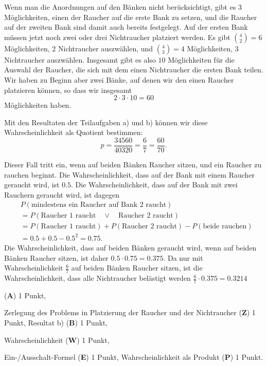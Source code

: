 \begin{loesung}
\begin{teilaufgaben}
Wenn man die Anordnungen auf den Bänken nicht berücksichtigt,
gibt es $3$ Möglichkeiten, einen der Raucher auf die erste Bank zu setzen,
und die Raucher auf der zweiten Bank sind damit auch bereits festgelegt.
Auf der ersten Bank müssen jetzt noch zwei oder drei Nichtraucher platziert
werden.
Es gibt $\binom{4}{2}=6$ Möglichkeiten, 2 Nichtraucher auszwählen, und
$\binom{4}{3}=4$ Möglichkeiten, 3 Nichtraucher auszwählen.
Insgesamt gibt es also $10$ Möglichkeiten für die Auswahl der Raucher,
die sich mit dem einen Nichtraucher die ersten Bank teilen.
Wir haben zu Beginn aber zwei Bänke, auf denen wir den einen Raucher
platzieren können, so dass wir insgesamt
\[
2\cdot 3\cdot 10 = 60
\]
Möglichkeiten haben.
\item
Mit den Resultaten der Teilaufgaben a) und b) können wir diese
Wahrscheinlichkeit als Quotient bestimmen:
\[
p= \frac{34560}{40320}=\frac{6}{7}=\frac{60}{70}.
\]
\item
Dieser Fall tritt ein, wenn auf beiden Bänken Raucher sitzen,
und ein Raucher zu rauchen beginnt.
Die Wahrscheinlichkeit, dass auf der Bank mit einem Raucher geraucht
wird, ist $0.5$.
Die Wahrscheinlichkeit, dass auf der Bank mit zwei Rauchern geraucht
wird, ist dagegen
\begin{align*}
&
P(\text{mindestens ein Raucher auf Bank 2 raucht})
\\
&=
P(\text{Raucher 1 raucht}\quad\vee\quad\text{Raucher 2 raucht})
\\
&=
P(\text{Raucher 1 raucht})
+
P(\text{Raucher 2 raucht})
-
P(\text{beide rauchen})
\\
&=
0.5+0.5-0.5^2 = 0.75.
\end{align*}
Die Wahrscheinlichkeit, dass auf beiden Bänken geraucht wird, wenn auf
beiden Bänken Raucher sitzen, ist daher $0.5\cdot 0.75 = 0.375$.
Da nur mit Wahrscheinlichkeit $\frac{6}{7}$ auf beiden Bänken
Raucher sitzen, ist die Wahrscheinlichkeit, dass alle Nichtraucher
belästigt werden $\frac{6}{7}\cdot 0.375=0.3214$
\qedhere
\end{teilaufgaben}
\end{loesung}

\begin{bewertung}
\begin{teilaufgaben}
\item
({\bf A}) 1 Punkt,
\item
Zerlegung des Problems in Platzierung der Raucher und der Nichtraucher
({\bf Z}) 1 Punkt,
Resultat b) ({\bf B}) 1 Punkt,
\item
Wahrscheinlichkeit ({\bf W}) 1 Punkt,
\item
Ein-/Ausschalt-Formel ({\bf E}) 1 Punkt,
Wahrscheinlichkeit als Produkt ({\bf P}) 1 Punkt.
\end{teilaufgaben}
\end{bewertung}


